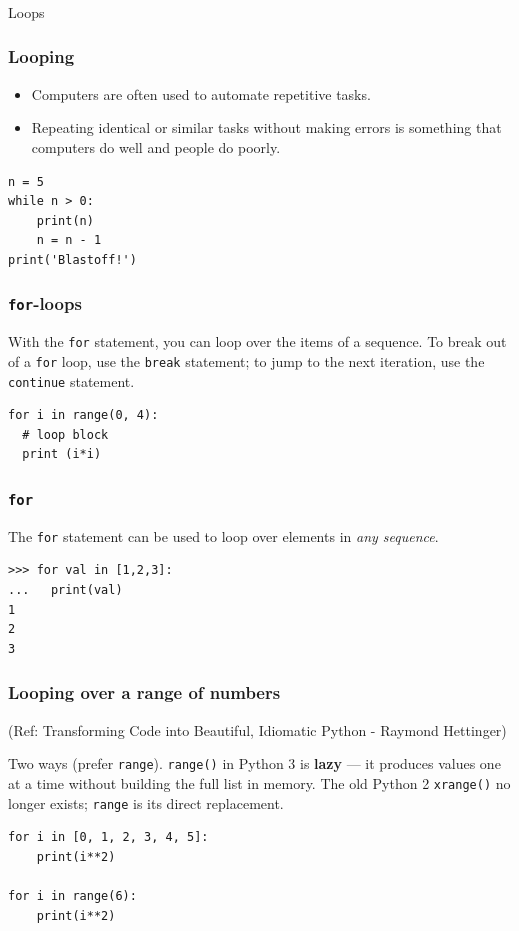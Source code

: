 \begin{frame}[fragile]\frametitle{}
\begin{center}
{\Large Loops}
\end{center}
\end{frame}


\begin{frame}[fragile]\frametitle{Looping}
\begin{itemize}
\item Computers are often used to automate repetitive tasks. 
\item  Repeating identical or similar tasks without making errors is something that computers do well and people
do poorly. 
\end{itemize}
\begin{lstlisting}
n = 5
while n > 0:
	print(n)
	n = n - 1
print('Blastoff!')
\end{lstlisting}
\end{frame}



\begin{frame}[fragile]
  \frametitle{\texttt{for}-loops}
    With the  \texttt{for} statement, you can loop over the items of
    a sequence. To break out of a \texttt{for} loop, use the \texttt{break}
    statement; to jump to the next iteration, use the \texttt{continue} statement.
\begin{lstlisting}
for i in range(0, 4):
  # loop block
  print (i*i)
\end{lstlisting}
\end{frame}

\begin{frame}[fragile]\frametitle{\texttt{for}}
  The \texttt{for} statement can be used to loop over elements in \emph{any sequence}.


\begin{lstlisting}
>>> for val in [1,2,3]:
...   print(val)
1
2
3
\end{lstlisting}
\end{frame}

\begin{frame}[fragile]\frametitle{Looping over a range of numbers}
\tiny{(Ref: Transforming Code into Beautiful, Idiomatic Python -  Raymond Hettinger)}

Two ways (prefer \texttt{range}). \texttt{range()} in Python 3 is \textbf{lazy} --- it produces values one at a time without building the full list in memory. The old Python 2 \texttt{xrange()} no longer exists; \texttt{range} is its direct replacement.
\begin{lstlisting}
for i in [0, 1, 2, 3, 4, 5]:
    print(i**2)

for i in range(6):
    print(i**2)
\end{lstlisting}
\end{frame}

